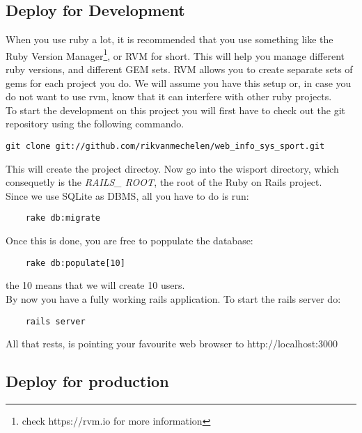 \subsection{Deploy for Development}
When you use ruby a lot, it is recommended that you use something like the Ruby Version Manager\footnote{check https://rvm.io for more information}, or RVM for short. This will help you manage different ruby versions, and different GEM sets. RVM allows you to create separate sets of gems for each project you do. We will assume you have this setup or, in case you do not want to use rvm, know that it can interfere with other ruby projects.\\
To start the development on this project you will first have to check out the git repository using the following commando.
\begin{lstlisting}
git clone git://github.com/rikvanmechelen/web_info_sys_sport.git
\end{lstlisting}
This will create the project directoy. Now go into the wisport directory, which consequetly is the \textit{RAILS\_ ROOT}, the root of the Ruby on Rails project.\\
Since we use SQLite as DBMS, all you have to do is run:
\begin{lstlisting}
	rake db:migrate
\end{lstlisting}
Once this is done, you are free to poppulate the database: 
\begin{lstlisting}
	rake db:populate[10]
\end{lstlisting}
the 10 means that we will create 10 users.\\
By now you have a fully working rails application.
To start the rails server do:
\begin{lstlisting}
	rails server
\end{lstlisting}
All that rests, is pointing your favourite web browser to http://localhost:3000

\subsection{Deploy for production}
